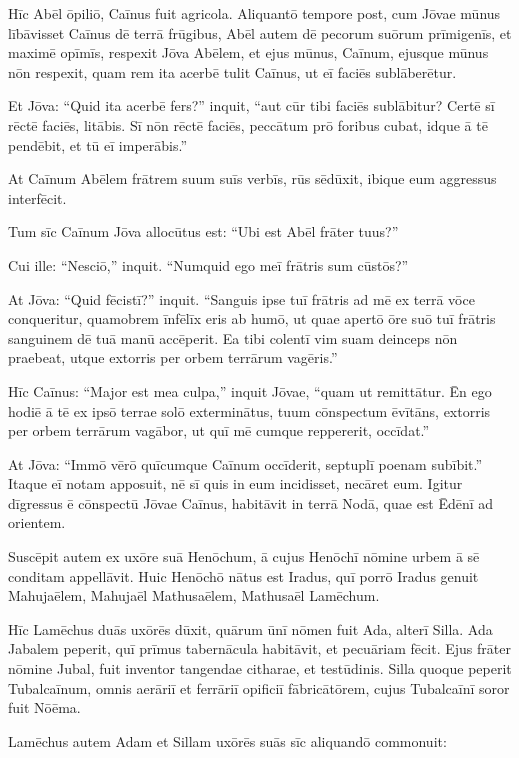 Hīc Abēl ōpiliō, Caīnus fuit agricola.
\Versus Aliquantō tempore post, cum Jōvae mūnus lībāvisset Caīnus dē terrā frūgibus,
\Versus Abēl autem dē pecorum suōrum prīmigenīs, et maximē opīmīs, respexit Jōva Abēlem, et ejus mūnus,
\Versus Caīnum, ejusque mūnus nōn respexit, quam rem ita acerbē tulit Caīnus, ut eī faciēs sublāberētur.

\Versus Et Jōva: ``Quid ita acerbē fers?'' inquit, ``aut cūr tibi faciēs sublābitur?
\Versus Certē sī rēctē faciēs, litābis. Sī nōn rēctē faciēs, peccātum prō foribus cubat, idque ā tē pendēbit, et tū eī imperābis.''

\Versus At Caīnum Abēlem frātrem suum suīs verbīs, rūs sēdūxit, ibique eum aggressus interfēcit.

\Versus Tum sīc Caīnum Jōva allocūtus est: ``Ubi est Abēl frāter tuus?''

Cui ille: ``Nesciō,'' inquit. ``Numquid ego meī frātris sum cūstōs?''

\Versus At Jōva: ``Quid fēcistī?'' inquit. ``Sanguis ipse tuī frātris ad mē ex terrā vōce conqueritur,
\Versus quamobrem īnfēlīx eris ab humō, ut quae apertō ōre suō tuī frātris sanguinem dē tuā manū accēperit.
\Versus Ea tibi colentī vim suam deinceps nōn praebeat, utque extorris per orbem terrārum vagēris.''

\Versus Hīc Caīnus: ``Major est mea culpa,'' inquit Jōvae, ``quam ut remittātur.
\Versus Ēn ego hodiē ā tē ex ipsō terrae solō exterminātus, tuum cōnspectum ēvītāns, extorris per orbem terrārum vagābor, ut quī mē cumque reppererit, occīdat.''

\Versus At Jōva: ``Immō vērō quīcumque Caīnum occīderit, septuplī poenam subībit.'' Itaque eī notam apposuit, nē sī quis in eum incidisset, necāret eum.
\Versus Igitur dīgressus ē cōnspectū Jōvae Caīnus, habitāvit in terrā Nodā, quae est Ēdēnī ad orientem.

\Versus Suscēpit autem ex uxōre suā Henōchum, ā cujus Henōchī nōmine urbem ā sē conditam appellāvit. Huic Henōchō nātus est Iradus, quī porrō Iradus genuit Mahujaēlem, Mahujaēl Mathusaēlem, Mathusaēl Lamēchum.

\Versus Hīc Lamēchus duās uxōrēs dūxit, quārum ūnī nōmen fuit Ada, alterī Silla.
\Versus Ada Jabalem peperit, quī prīmus tabernācula habitāvit, et pecuāriam fēcit.
\Versus Ejus frāter nōmine Jubal, fuit inventor tangendae citharae, et testūdinis.
\Versus Silla quoque peperit Tubalcaīnum, omnis aerāriī et ferrāriī opificiī fābricātōrem, cujus Tubalcaīnī soror fuit Nōēma.

\Versus Lamēchus autem Adam et Sillam uxōrēs suās sīc aliquandō commonuit:


